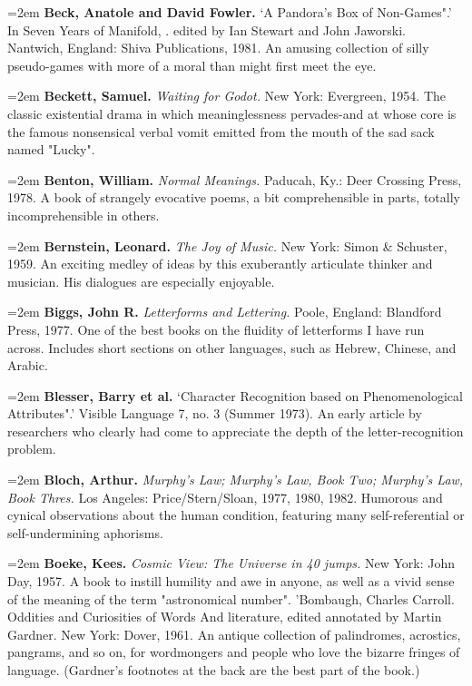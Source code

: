 \par\noindent\hangindent=2em {\bf Beck, Anatole and David Fowler.} `A Pandora's Box of Non-Games".' In Seven Years of Manifold, . edited by Ian Stewart and John Jaworski. Nantwich, England: Shiva Publications, 1981. An amusing collection of silly pseudo-games with more of a moral than might first meet the eye.

\par\noindent\hangindent=2em {\bf Beckett, Samuel.} {\it Waiting for Godot.} New York: Evergreen, 1954. The classic existential drama in which meaninglessness pervades-and at whose core is the famous nonsensical verbal vomit emitted from the mouth of the sad sack named "Lucky".

\par\noindent\hangindent=2em {\bf Benton, William.} {\it Normal Meanings.} Paducah, Ky.: Deer Crossing Press, 1978. A book of strangely evocative poems, a bit comprehensible in parts, totally incomprehensible in others.

\par\noindent\hangindent=2em {\bf Bernstein, Leonard.} {\it The Joy of Music.} New York: Simon \& Schuster, 1959. An exciting medley of ideas by this exuberantly articulate thinker and musician. His dialogues are especially enjoyable.

\par\noindent\hangindent=2em {\bf Biggs, John R.} {\it Letterforms and Lettering.} Poole, England: Blandford Press, 1977. One of the best books on the fluidity of letterforms I have run across. Includes short sections on other languages, such as Hebrew, Chinese, and Arabic.

\par\noindent\hangindent=2em {\bf Blesser, Barry et al.} `Character Recognition based on Phenomenological Attributes".' Visible Language 7, no. 3 (Summer 1973). An early article by researchers who clearly had come to appreciate the depth of the letter-recognition problem.

\par\noindent\hangindent=2em {\bf Bloch, Arthur.} {\it Murphy's Law; Murphy's Law, Book Two; Murphy's Law, Book Thres.} Los Angeles: Price/Stern/Sloan, 1977, 1980, 1982. Humorous and cynical observations about the human condition, featuring many self-referential or self-undermining aphorisms.

\par\noindent\hangindent=2em {\bf Boeke, Kees.} {\it Cosmic View: The Universe in 40 jumps.} New York: John Day, 1957. A book to instill humility and awe in anyone, as well as a vivid sense of the meaning of the term "astronomical number". 'Bombaugh, Charles Carroll. Oddities and Curiosities of Words And literature, edited annotated by Martin Gardner. New York: Dover, 1961. An antique collection of palindromes, acrostics, pangrams, and so on, for wordmongers and people who love the bizarre fringes of language. (Gardner's footnotes at the back are the best part of the book.)

